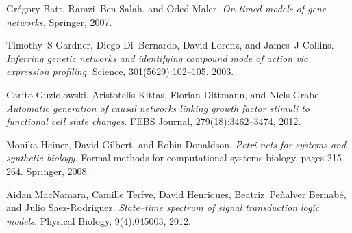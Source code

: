 \begin{frame}[c]
Gr{\'e}gory Batt, Ramzi~Ben Salah, and Oded Maler.
 \textit{On timed models of gene networks.}
 Springer, 2007.

Timothy~S Gardner, Diego Di~Bernardo, David Lorenz, and James~J Collins.
 \textit{Inferring genetic networks and identifying compound mode of action
  via expression profiling.}
  Science, 301(5629):102--105, 2003.

Carito Guziolowski, Aristotelis Kittas, Florian Dittmann, and Niels Grabe.
\textit{ Automatic generation of causal networks linking growth factor stimuli
  to functional cell state changes.}
 FEBS Journal, 279(18):3462--3474, 2012.

Monika Heiner, David Gilbert, and Robin Donaldson.
 \textit{Petri nets for systems and synthetic biology.}
 Formal methods for computational systems biology, pages
  215--264. Springer, 2008.

Aidan MacNamara, Camille Terfve, David Henriques, Beatriz~Pe{\~n}alver
  Bernab{\'e}, and Julio Saez-Rodriguez.
 \textit{State--time spectrum of signal transduction logic models.}
 Physical Biology, 9(4):045003, 2012.


\vfill
\Large
\begin{flushright}
  \hspace{1cm}~
\end{flushright}
\vfill

~

\end{frame}

